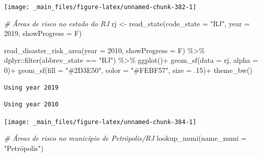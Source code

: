 \documentclass[
  brazilian,
]{book}
\newenvironment{Shaded}{\begin{snugshade}}{\end{snugshade}}
\newcommand{\AttributeTok}[1]{\textcolor[rgb]{0.77,0.63,0.00}{#1}}
\newcommand{\CommentTok}[1]{\textcolor[rgb]{0.56,0.35,0.01}{\textit{#1}}}
\newcommand{\DecValTok}[1]{\textcolor[rgb]{0.00,0.00,0.81}{#1}}
\newcommand{\FunctionTok}[1]{\textcolor[rgb]{0.00,0.00,0.00}{#1}}
\newcommand{\NormalTok}[1]{#1}
\newcommand{\OtherTok}[1]{\textcolor[rgb]{0.56,0.35,0.01}{#1}}
\newcommand{\SpecialCharTok}[1]{\textcolor[rgb]{0.00,0.00,0.00}{#1}}
\newcommand{\StringTok}[1]{\textcolor[rgb]{0.31,0.60,0.02}{#1}}
\begin{document}
\begin{center}\texttt{[image: \_main\_files/figure-latex/unnamed-chunk-382-1]} \end{center}

\begin{Shaded}
\begin{Highlighting}[]
\CommentTok{\# Áreas de risco no estado do RJ}
\NormalTok{rj }\OtherTok{\textless{}{-}} \FunctionTok{read\_state}\NormalTok{(}\AttributeTok{code\_state =} \StringTok{"RJ"}\NormalTok{,}
                 \AttributeTok{year =} \DecValTok{2019}\NormalTok{,}
                 \AttributeTok{showProgress =}\NormalTok{ F)}

\FunctionTok{read\_disaster\_risk\_area}\NormalTok{(}\AttributeTok{year =} \DecValTok{2010}\NormalTok{,}
                        \AttributeTok{showProgress =}\NormalTok{ F) }\SpecialCharTok{\%\textgreater{}\%}
\NormalTok{  dplyr}\SpecialCharTok{::}\FunctionTok{filter}\NormalTok{(abbrev\_state }\SpecialCharTok{==} \StringTok{"RJ"}\NormalTok{) }\SpecialCharTok{\%\textgreater{}\%}
  \FunctionTok{ggplot}\NormalTok{()}\SpecialCharTok{+}
  \FunctionTok{geom\_sf}\NormalTok{(}\AttributeTok{data =}\NormalTok{ rj, }\AttributeTok{alpha =} \DecValTok{0}\NormalTok{)}\SpecialCharTok{+}
  \FunctionTok{geom\_sf}\NormalTok{(}\AttributeTok{fill =} \StringTok{"\#2D3E50"}\NormalTok{, }\AttributeTok{color =} \StringTok{"\#FEBF57"}\NormalTok{, }\AttributeTok{size =}\NormalTok{ .}\DecValTok{15}\NormalTok{)}\SpecialCharTok{+}
  \FunctionTok{theme\_bw}\NormalTok{()}
\end{Highlighting}
\end{Shaded}

\begin{verbatim}
Using year 2019
\end{verbatim}

\begin{verbatim}
Using year 2010
\end{verbatim}

\begin{center}\texttt{[image: \_main\_files/figure-latex/unnamed-chunk-384-1]} \end{center}

\begin{Shaded}
\begin{Highlighting}[]
\CommentTok{\# Áreas de risco no município de Petrópolis/RJ}
\FunctionTok{lookup\_muni}\NormalTok{(}\AttributeTok{name\_muni =} \StringTok{"Petrópolis"}\NormalTok{)}
\end{Highlighting}
\end{Shaded}
\end{document}
